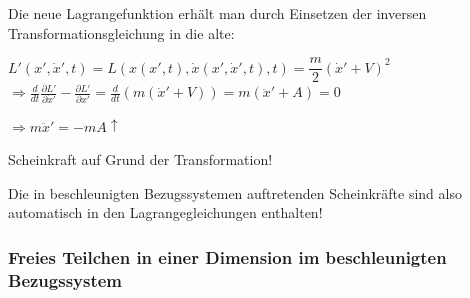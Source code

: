 \documentclass[10pt, letterpaper]{article}
\begin{document}
Die neue Lagrangefunktion erhält man durch Einsetzen der inversen Transformationsgleichung in die alte:

$L'(x',\dot{x}',t) = L(x(x',t),\dot{x}(x',\dot{x}',t),t) = \dfrac{m}{2}(\dot{x}' + V)^2$
$\Rightarrow \frac{d}{dt}\frac{\partial L'}{\partial \dot{x}'} - \frac{\partial L'}{\partial x'} = \frac{d}{dt}(m(\dot{x}'+V)) = m(\ddot{x}'+A) = 0$

$\Rightarrow m\ddot{x}' = -mA \uparrow$

\noindent Scheinkraft auf Grund der Transformation!

Die in beschleunigten Bezugssystemen auftretenden Scheinkräfte sind also automatisch in den Lagrangegleichungen enthalten!





\subsubsection{Freies Teilchen in einer Dimension im beschleunigten Bezugssystem}


\begin{center}
\end{center}
\end{document}
